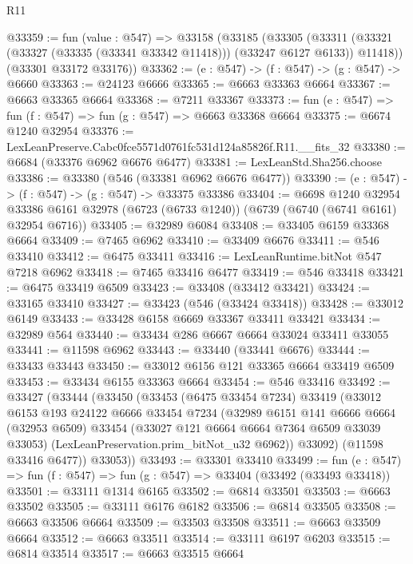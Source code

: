 \begin{lexlean}{R11}
\begin{coremodule}
@33359 := fun (value : @547) =>
  @33158
    (@33185
      (@33305
        (@33311 (@33321 (@33327 (@33335 (@33341 @33342 @11418))) (@33247 @6127 @6133)) @11418))
      (@33301 @33172 @33176))
@33362 := (e : @547) -> (f : @547) -> (g : @547) -> @6660
@33363 := @24123 @6666
@33365 := @6663 @33363 @6664
@33367 := @6663 @33365 @6664
@33368 := @7211 @33367
@33373 := fun (e : @547) => fun (f : @547) => fun (g : @547) => @6663 @33368 @6664
@33375 := @6674 @1240 @32954
@33376 := LexLeanPreserve.Cabc0fce5571d0761fc531d124a85826f.R11.__fits_32
@33380 := @6684 (@33376 @6962 @6676 @6477)
@33381 := LexLeanStd.Sha256.choose
@33386 := @33380 (@546 (@33381 @6962 @6676 @6477))
@33390 := (e : @547) -> (f : @547) -> (g : @547) -> @33375 @33386
@33404 := @6698
    @1240
    @32954
    @33386
    @6161
    @32978
    (@6723 (@6733 @1240))
    (@6739 (@6740 (@6741 @6161) @32954 @6716))
@33405 := @32989 @6084
@33408 := @33405 @6159 @33368 @6664
@33409 := @7465 @6962
@33410 := @33409 @6676
@33411 := @546 @33410
@33412 := @6475 @33411
@33416 := LexLeanRuntime.bitNot @547 @7218 @6962
@33418 := @7465 @33416 @6477
@33419 := @546 @33418
@33421 := @6475 @33419 @6509
@33423 := @33408 (@33412 @33421)
@33424 := @33165 @33410
@33427 := @33423 (@546 (@33424 @33418))
@33428 := @33012 @6149
@33433 := @33428 @6158 @6669 @33367 @33411 @33421
@33434 := @32989 @564
@33440 := @33434 @286 @6667 @6664 @33024 @33411 @33055
@33441 := @11598 @6962
@33443 := @33440 (@33441 @6676)
@33444 := @33433 @33443
@33450 := @33012 @6156 @121 @33365 @6664 @33419 @6509
@33453 := @33434 @6155 @33363 @6664
@33454 := @546 @33416
@33492 := @33427
    (@33444
      (@33450
        (@33453
          (@6475 @33454 @7234)
          @33419
          (@33012
            @6153
            @193
            @24122
            @6666
            @33454
            @7234
            (@32989
              @6151
              @141
              @6666
              @6664
              (@32953 @6509)
              @33454
              (@33027 @121 @6664 @6664 @7364 @6509 @33039 @33053)
              (LexLeanPreservation.prim_bitNot_u32 @6962))
            @33092)
          (@11598 @33416 @6477))
        @33053))
@33493 := @33301 @33410
@33499 := fun (e : @547) => fun (f : @547) => fun (g : @547) => @33404 (@33492 (@33493 @33418))
@33501 := @33111 @1314 @6165
@33502 := @6814 @33501
@33503 := @6663 @33502
@33505 := @33111 @6176 @6182
@33506 := @6814 @33505
@33508 := @6663 @33506 @6664
@33509 := @33503 @33508
@33511 := @6663 @33509 @6664
@33512 := @6663 @33511
@33514 := @33111 @6197 @6203
@33515 := @6814 @33514
@33517 := @6663 @33515 @6664

\end{coremodule}
\end{lexlean}
